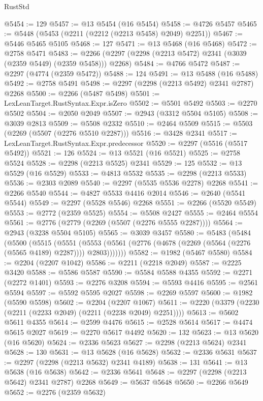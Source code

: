 \begin{lexlean}{RustStd}
\begin{coremodule}
{\begin{coremodule}
{{{{{{{{{{{{{{{{{{{{{{{{{{{{{{{{{{{{{{{{{{{{{{{{{{{{{{@5454 := 129
@5457 := @13 @5454 (@16 @5454)
@5458 := @4726 @5457
@5465 := @5448 (@5453 (@2211 (@2212 (@2213 @5458) @2049) @2251))
@5467 := @5446 @5465 @5105
@5468 := 127
@5471 := @13 @5468 (@16 @5468)
@5472 := @2758 @5471
@5483 := @2266 (@2297 (@2298 (@2213 @5472) @2341 (@3039 (@2359 @5449) (@2359 @5458))) @2268)
@5484 := @4766 @5472
@5487 := @2297 (@4774 (@2359 @5472))
@5488 := 124
@5491 := @13 @5488 (@16 @5488)
@5492 := @2758 @5491
@5498 := @2297 (@2298 (@2213 @5492) @2341 @2787) @2268
@5500 := @2266 (@5487 @5498)
@5501 := LexLeanTarget.RustSyntax.Expr.isZero
@5502 := @5501 @5492
@5503 := @2270 @5502
@5504 := @2050 @2049
@5507 := @2943 (@3312 @5504 @5105)
@5508 := @3039 @2813
@5509 := @5508 @2332
@5510 := @2464 @5509
@5515 := @5503 (@2269 (@5507 (@2276 @5510 @2287)))
@5516 := @3428 @2341
@5517 := LexLeanTarget.RustSyntax.Expr.predecessor
@5520 := @2297 (@5516 (@5517 @5492))
@5521 := 126
@5524 := @13 @5521 (@16 @5521)
@5525 := @2758 @5524
@5528 := @2298 (@2213 @5525) @2341
@5529 := 125
@5532 := @13 @5529 (@16 @5529)
@5533 := @4813 @5532
@5535 := @2298 (@2213 @5533)
@5536 := @2303 @2089
@5540 := @2297 (@5535 @5536 @2278) @2268
@5541 := @2266 @5540
@5544 := @4827 @5533 @4416 @2014
@5546 := @2640 (@5541 @5544)
@5549 := @2297 (@5528 @5546) @2268
@5551 := @2266 (@5520 @5549)
@5553 := @2772 (@2359 @5525)
@5554 := @5508 @2427
@5555 := @2464 @5554
@5561 := @2776 (@2779 (@2269 (@5507 (@2276 @5555 @2287))))
@5564 := @2943 (@3238 @5504 @5105)
@5565 := @3039 @3457
@5580 := @5483
    (@5484
      (@5500
        (@5515
          (@5551
            (@5553 (@5561 (@2776 (@4678 (@2269 (@5564 (@2276 (@5565 @4189) @2287)))) @2803)))))))
@5582 := @1982 (@5467 @5580)
@5584 := @2204 (@2207 @1042)
@5586 := @2211 (@2218 @2049)
@5587 := @2225 @3420
@5588 := @5586 @5587
@5590 := @5584 @5588 @4355
@5592 := @2271 (@2272 @1401)
@5593 := @2276 @3208
@5594 := @5593 @4416
@5595 := @2561 @5594
@5597 := @5592 @5595 @2027
@5598 := @2269 @5597
@5600 := @1982 (@5590 @5598)
@5602 := @2204 (@2207 @1067)
@5611 := @2220 (@3379 (@2230 (@2211 (@2233 @2049) (@2211 (@2238 @2049) @2251))))
@5613 := @5602 @5611 @4355
@5614 := @2599 @4476
@5615 := @2528 @5614
@5617 := @4474 @5615 @2027
@5619 := @2270 @5617 @4492
@5620 := 132
@5623 := @13 @5620 (@16 @5620)
@5624 := @2336 @5623
@5627 := @2298 (@2213 @5624) @2341
@5628 := 130
@5631 := @13 @5628 (@16 @5628)
@5632 := @2336 @5631
@5637 := @2297 (@2298 (@2213 @5632) @2341 @4189)
@5638 := 131
@5641 := @13 @5638 (@16 @5638)
@5642 := @2336 @5641
@5648 := @2297 (@2298 (@2213 @5642) @2341 @2787) @2268
@5649 := @5637 @5648
@5650 := @2266 @5649
@5652 := @2276 (@2359 @5632)
}}}}}}}}}}}}}}}}}}}}}}}}}}}}}}}}}}}}}}}}}}}}}}}}}}}}}}
\end{coremodule}}
\end{coremodule}
\end{lexlean}
